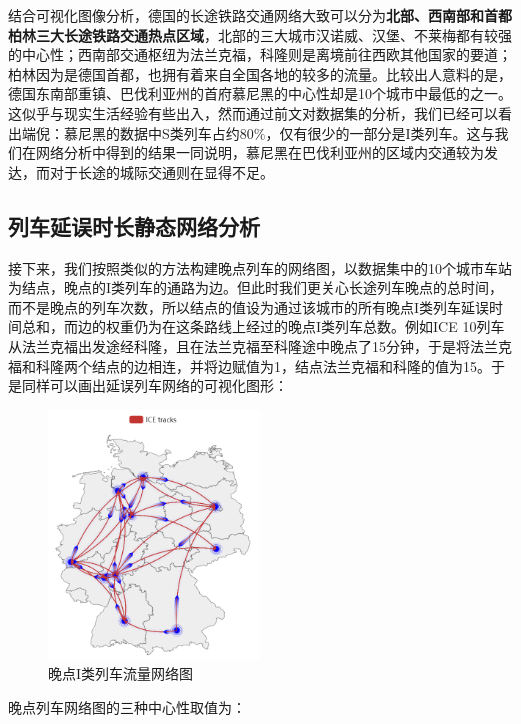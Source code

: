 \documentclass[lang=cn,12pt,a4paper,cite=authoryear]{elegantpaper}
\begin{document}
结合可视化图像分析，德国的长途铁路交通网络大致可以分为\textbf{北部、西南部和首都柏林三大长途铁路交通热点区域}，北部的三大城市汉诺威、汉堡、不莱梅都有较强的中心性；西南部交通枢纽为法兰克福，科隆则是离境前往西欧其他国家的要道；柏林因为是德国首都，也拥有着来自全国各地的较多的流量。比较出人意料的是，德国东南部重镇、巴伐利亚州的首府慕尼黑的中心性却是10个城市中最低的之一。这似乎与现实生活经验有些出入，然而通过前文对数据集的分析，我们已经可以看出端倪：慕尼黑的数据中S类列车占约$80\%$，仅有很少的一部分是I类列车。这与我们在网络分析中得到的结果一同说明，慕尼黑在巴伐利亚州的区域内交通较为发达，而对于长途的城际交通则在显得不足。

\subsection{列车延误时长静态网络分析}

接下来，我们按照类似的方法构建晚点列车的网络图，以数据集中的10个城市车站为结点，晚点的I类列车的通路为边。但此时我们更关心长途列车晚点的总时间，而不是晚点的列车次数，所以结点的值设为通过该城市的所有晚点I类列车延误时间总和，而边的权重仍为在这条路线上经过的晚点I类列车总数。例如ICE 10列车从法兰克福出发途经科隆，且在法兰克福至科隆途中晚点了15分钟，于是将法兰克福和科隆两个结点的边相连，并将边赋值为1，结点法兰克福和科隆的值为15。于是同样可以画出延误列车网络的可视化图形：

\begin{figure}[H]
	\centering
	\includegraphics[width=0.5\textwidth]{image/graph2.png}
	\caption{晚点I类列车流量网络图}
	\label{fig10}
\end{figure}

晚点列车网络图的三种中心性取值为：
\end{document}
